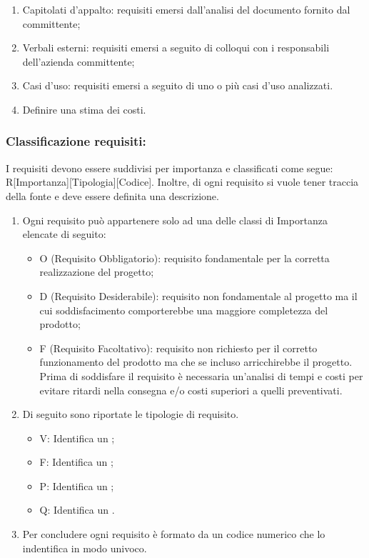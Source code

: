 \documentclass[../NomeDocumento.tex]{subfiles}
\begin{document}
	\begin{enumerate}
		\item Capitolati d’appalto: requisiti emersi dall’analisi del documento fornito dal committente;
		\item Verbali esterni: requisiti emersi a seguito di colloqui con i responsabili dell’azienda committente;
		\item Casi d'uso: requisiti emersi a seguito di uno o più casi d’uso analizzati.
		\item Definire una stima dei costi.
	\end{enumerate}

	\subsubsection{Classificazione requisiti:} 
	
	I requisiti devono essere suddivisi per importanza e classificati come segue: R[Importanza][Tipologia][Codice]. Inoltre, di ogni requisito si vuole tener traccia della fonte e deve essere definita una descrizione.
	
		\begin{enumerate}
			\item Ogni requisito può appartenere solo ad una delle classi di Importanza elencate di seguito:
			\begin{itemize}
				\item O (Requisito Obbligatorio): requisito fondamentale per la corretta realizzazione del progetto;
				\item D (Requisito Desiderabile): requisito non fondamentale al progetto ma il cui soddisfacimento comporterebbe una maggiore completezza del prodotto;
				\item F (Requisito Facoltativo): requisito non richiesto per il corretto funzionamento del prodotto ma che se incluso arricchirebbe il progetto. Prima di soddisfare il requisito è necessaria un’analisi di tempi e costi per evitare ritardi nella consegna e/o costi superiori a quelli preventivati.
			\end{itemize}
			\item Di seguito sono riportate le tipologie di requisito.
			\begin{itemize}
				\item V: Identifica un ;
				\item F: Identifica un ;
				\item P: Identifica un ;
				\item Q: 
				Identifica un .
			\end{itemize}
		\item Per concludere ogni requisito è formato da un codice numerico che lo indentifica in modo univoco.
		\end{enumerate}
		
\end{document}
